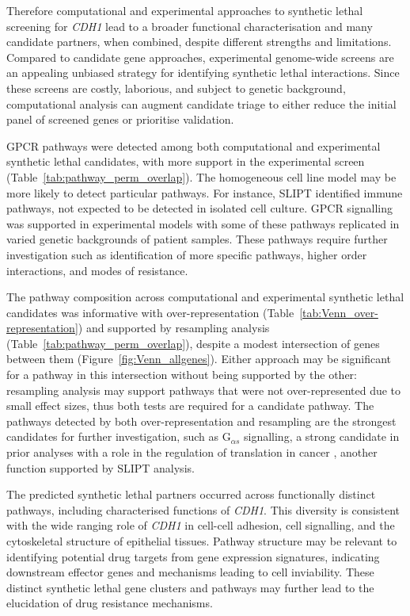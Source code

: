 Therefore computational and experimental approaches to synthetic lethal screening for \textit{CDH1} lead to a broader functional characterisation and many candidate partners, when combined, despite different strengths and limitations. Compared to candidate gene approaches, experimental genome-wide screens are an appealing unbiased strategy for identifying synthetic lethal interactions. Since these screens are costly, laborious, and subject to genetic background, computational analysis can augment candidate triage to either reduce the initial panel of screened genes or prioritise validation.

GPCR pathways were detected among both computational and experimental synthetic lethal candidates, with more support in the experimental screen (Table~\ref{tab:pathway_perm_overlap}). The homogeneous cell line model may be more likely to detect particular pathways. For instance, SLIPT identified immune pathways, not expected to be detected in isolated cell culture. GPCR signalling was supported in experimental models \cite{Telford2015} with some of these pathways replicated in varied genetic backgrounds of patient samples. These pathways require further investigation such as identification of more specific pathways, higher order interactions, and modes of resistance.

The pathway composition across computational and experimental synthetic lethal candidates was informative with over-represent\-ation (Table~\ref{tab:Venn_over-representation}) and supported by resampling analysis (Table~\ref{tab:pathway_perm_overlap}), despite a modest intersection of genes between them (Figure~\ref{fig:Venn_allgenes}).
Either approach may be significant for a pathway in this intersection without being supported by the other: resampling analysis may support pathways that were not over-represent\-ed due to small effect sizes, thus both tests are required for a candidate pathway.
The pathways detected by both over-represent\-ation and resampling are the strongest candidates for further investigation, such as G$_{\alpha s}$ signalling, a strong candidate in prior analyses with a role in the regulation of translation in cancer \cite{Gao2015}, another function supported by SLIPT analysis.

The predicted synthetic lethal partners occurred across functionally distinct pathways, including characterised functions of \textit{CDH1}. This diversity is consistent with the wide ranging role of \textit{CDH1} in cell-cell adhesion, cell signalling, and the cytoskeletal structure of epithelial tissues. Pathway structure may be relevant to identifying potential drug targets from gene expression signatures, indicating downstream effector genes and mechanisms leading to cell inviability. These distinct synthetic lethal gene clusters and pathways may further lead to the elucidation of drug resistance mechanisms.

